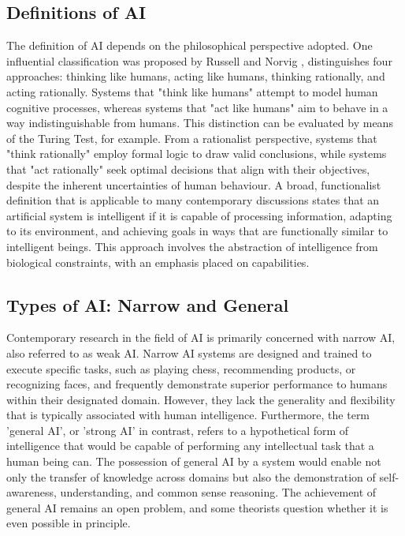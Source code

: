 \documentclass[runningheads]{llncs}
\begin{document}
\subsection{Definitions of AI}
%
The definition of AI depends on the philosophical perspective adopted. One influential classification was proposed by Russell and Norvig \cite{russell2010artificial}, distinguishes four approaches: thinking like humans, acting like humans, thinking rationally, and acting rationally. Systems that "think like humans" attempt to model human cognitive processes, whereas systems that "act like humans" aim to behave in a way indistinguishable from humans. This distinction can be evaluated by means of the Turing Test, for example. From a rationalist perspective, systems that "think rationally" employ formal logic to draw valid conclusions, while systems that "act rationally" seek optimal decisions that align with their objectives, despite the inherent uncertainties of human behaviour.
A broad, functionalist definition that is applicable to many contemporary discussions states that an artificial system is intelligent if it is capable of processing information, adapting to its environment, and achieving goals in ways that are functionally similar to intelligent beings. This approach involves the abstraction of intelligence from biological constraints, with an emphasis placed on capabilities.
%
\subsection{Types of AI: Narrow and General}
%
Contemporary research in the field of AI is primarily concerned with narrow AI, also referred to as weak AI. Narrow AI systems are designed and trained to execute specific tasks, such as playing chess, recommending products, or recognizing faces, and frequently demonstrate superior performance to humans within their designated domain. However, they lack the generality and flexibility that is typically associated with human intelligence.
Furthermore, the term 'general AI', or 'strong AI' in contrast, refers to a hypothetical form of intelligence that would be capable of performing any intellectual task that a human being can. The possession of general AI by a system would enable not only the transfer of knowledge across domains but also the demonstration of self-awareness, understanding, and common sense reasoning. The achievement of general AI remains an open problem, and some theorists question whether it is even possible in principle.
%
%
\end{document}
